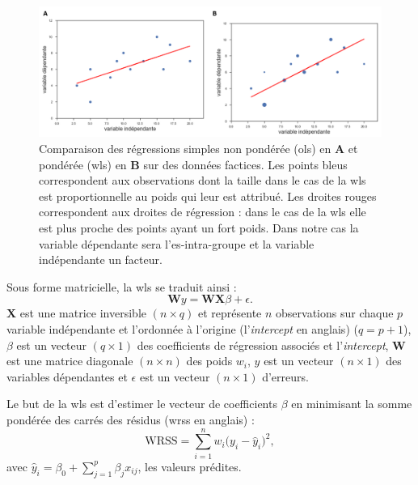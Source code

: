 \begin{figure}[h!]
  \centering
	\includegraphics[width=1.0\linewidth]{figures/chapter-3/factors-comparison-ols-wls} 
  \caption{Comparaison des régressions simples non pondérée (\gls{ols}) en \textbf{A} et pondérée (\gls{wls}) en \textbf{B} sur des données factices. Les points bleus correspondent aux observations
	dont la taille dans le cas de la \gls{wls} est proportionnelle au poids qui leur est attribué. Les droites rouges correspondent aux droites de régression : dans le cas de la \gls{wls} elle
	est plus proche des points ayant un fort poids. Dans notre cas la variable dépendante sera l'\gls{es}-intra-groupe et la variable indépendante un facteur.}
  \label{Figure:factors_comparison_ols_wls}
\end{figure}

Sous forme matricielle, la \gls{wls} se traduit ainsi : 
\begin{equation}
\label{eq:factors_model_WLS}
\textbf{W}y = \textbf{WX}\beta + \epsilon.
\end{equation}
$\textbf{X}$ est une matrice inversible $(n \times q)$ et représente $n$ observations sur chaque $p$ variable indépendante et l'ordonnée à l'origine (l'\textit{intercept} en anglais) 
($q = p + 1$), 
$\beta$ est un vecteur $(q \times 1)$ des coefficients de régression associés et l'\textit{intercept}, $\textbf{W}$ est une matrice diagonale $(n \times n)$  
des poids $w_{i}$, $y$ est un vecteur $(n \times 1)$ des variables dépendantes et $\epsilon$ est un vecteur $(n \times 1)$ d'erreurs.

Le but de la \gls{wls} est d'estimer le vecteur de coefficients $\beta$ en minimisant la somme pondérée des carrés des résidus (\gls{wrss} en anglais) :
\begin{equation}
\label{eq:factors_WRSS}
\text{WRSS} = \sum_{i=1}^{n} w_i \Big(y_i - \hat{y}_i\Big)^2, 
\end{equation}
avec $\hat{y}_i = \beta_{0} + \sum_{j=1}^{p}\beta_{j}x_{ij}$, les valeurs prédites.

